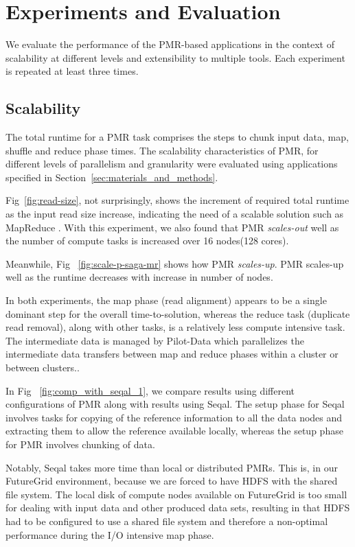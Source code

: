 \documentclass{acm_proc_article-sp}
\begin{document}
\section{Experiments and Evaluation}\label{sec:results}

We evaluate the performance of the PMR-based applications in the
context of scalability at different levels and extensibility to
multiple tools.  Each experiment is repeated at least three times.

\subsection{Scalability}

The total runtime for a PMR task comprises the steps to chunk input data, map, shuffle
and reduce phase times.  The scalability characteristics of PMR, for
different levels of parallelism and granularity were evaluated using
applications specified in Section~\ref{sec:materials_and_methods}.  




Fig~\ref{fig:read-size}, not surprisingly, shows the increment of required total runtime as the input read size increase, indicating the need of a scalable solution such as MapReduce .  With this experiment, we also found that PMR \textit{scales-out} well as the number of compute tasks is increased over 16 nodes(128 cores).

Meanwhile, Fig ~\ref{fig:scale-p-saga-mr} shows how PMR \textit{scales-up}. PMR
scales-up well as the runtime decreases with increase in number of nodes.

In both experiments, the map phase (read alignment) appears to be a single dominant step for
the overall time-to-solution, whereas the reduce task (duplicate read
removal), along with other tasks, is a relatively less compute intensive task.  The intermediate
data is managed by Pilot-Data which parallelizes the intermediate data
transfers between map and reduce phases within a cluster or between
clusters..

In Fig ~\ref{fig:comp_with_seqal_1}, we compare results using different
configurations of PMR along with results using Seqal.   The setup phase for Seqal involves
tasks for copying of the reference information to all the data nodes and extracting them to allow the reference available locally, whereas the setup phase for PMR involves chunking of data.  

Notably, Seqal takes more time than local or distributed PMRs.   This is, in our FutureGrid environment, because we are forced to have HDFS with the shared file system. The local disk of compute nodes available on FutureGrid is too small for dealing with input data and other produced data sets, resulting in that HDFS had to be configured to use a shared file system and therefore a
non-optimal performance during the I/O intensive map phase.
\end{document}
